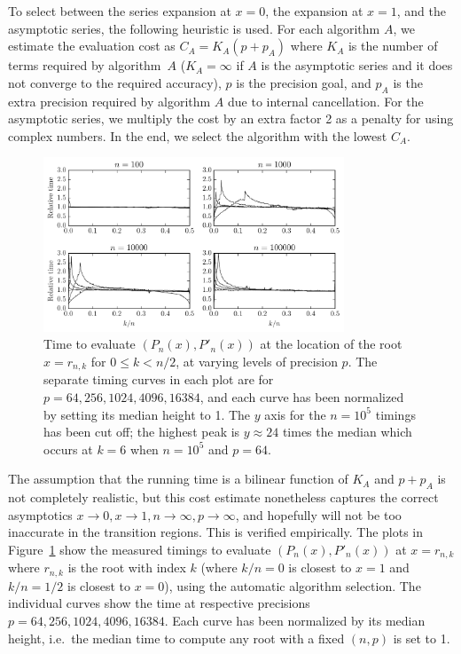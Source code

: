 \documentclass[11pt,a4paper]{article}
\begin{document}
To select between the series expansion at $x = 0$, the expansion at $x = 1$, and the asymptotic series, the following heuristic is used. For each algorithm $A$, we estimate the evaluation cost as $C_A = K_A (p + p_A)$ where $K_A$ is the number of terms required by algorithm~$A$ ($K_A = \infty$ if $A$ is the asymptotic series and it does not converge to the required accuracy), $p$ is the precision goal, and $p_A$ is the extra precision required by algorithm $A$ due to internal cancellation. For the asymptotic series, we multiply the cost by an extra factor 2 as a penalty for using complex numbers. In the end, we select the algorithm with the lowest $C_A$.

\begin{figure}[h!]
\begin{centering}
\includegraphics[width=0.8\textwidth]{timeplot}
\caption{Time to evaluate $(P_n(x), P'_n(x))$ at the location of the root $x = r_{n,k}$ for $0 \le k < n/2$, at varying levels of precision $p$.
The separate timing curves in each plot are for $p = 64, 256, 1024, 4096, 16384$, and each curve has been normalized by setting its median height to 1. The $y$ axis for the $n = 10^5$ timings has been cut off; the highest peak is $y \approx 24$ times the median which occurs at $k = 6$ when $n = 10^5$ and $p = 64$.}
\label{fig:timeplot}
\end{centering}
\end{figure}

The assumption that the running time is a bilinear function of $K_A$ and $p + p_A$ is not completely realistic, but this cost estimate nonetheless captures the correct asymptotics $x \to 0, x \to 1, n \to \infty, p \to \infty$, and hopefully will not be too inaccurate in the transition regions. This is verified empirically. The plots in Figure~\ref{fig:timeplot} show the measured timings to evaluate $(P_n(x), P'_n(x))$ at $x = r_{n,k}$ where $r_{n,k}$ is the root with index $k$ (where $k/n = 0$ is closest to $x = 1$ and $k/n = 1/2$ is closest to $x = 0$), using the automatic algorithm selection. The individual curves show the time at respective precisions $p = 64, 256, 1024, 4096, 16384$. Each curve has been normalized by its median height, i.e.\ the median time to compute any root with a fixed $(n,p)$ is set to 1.
\end{document}
